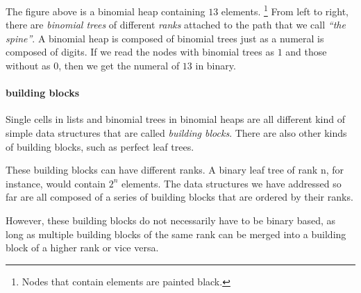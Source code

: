 \documentclass[\main/thesis.tex]{subfiles}
\begin{document}
The figure above is a binomial heap containing $ 13 $ elements.
\footnote{Nodes that contain elements are painted black.}
From left to right, there are \textit{binomial trees} of different \textit{ranks}
attached to the path that we call \textit{``the spine''}.
A binomial heap is composed of binomial trees just as a numeral is composed
of digits. If we read the nodes with binomial trees as $ 1 $ and those without
as $ 0 $, then we get the numeral of $ 13 $ in binary.

\paragraph{building blocks}

Single cells in lists and binomial trees in binomial heaps are all different
kind of simple data structures that are called \textit{building blocks}.
There are also other kinds of building blocks, such as perfect leaf trees.

\begin{center}
\end{center}

These building blocks can have different ranks.
A binary leaf tree of rank n, for instance, would contain $ 2^n $ elements.
The data structures we have addressed so far are all composed of a series of
building blocks that are ordered by their ranks.

However, these building blocks do not necessarily have to be binary based,
as long as multiple building blocks of the same rank can be merged into a
building block of a higher rank or vice versa.
\end{document}
